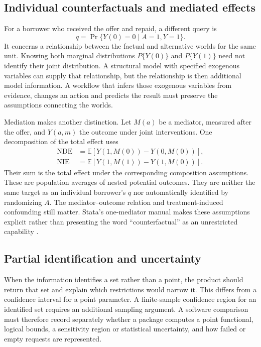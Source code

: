 \subsection{Individual counterfactuals and mediated effects}

For a borrower who received the offer and repaid, a different query is
\[
 q=\Pr\{Y(0)=0\mid A=1,Y=1\}.
\]
It concerns a relationship between the factual and alternative worlds for
the same unit. Knowing both marginal distributions $P\{Y(0)\}$ and
$P\{Y(1)\}$ need not identify their joint distribution. A structural model
with specified exogenous variables can supply that relationship, but the
relationship is then additional model information. A workflow that infers
those exogenous variables from evidence, changes an action and predicts the
result must preserve the assumptions connecting the worlds.

Mediation makes another distinction. Let $M(a)$ be a mediator, measured after
the offer, and $Y(a,m)$ the outcome under joint interventions. One decomposition
of the total effect uses
\begin{align*}
 \mathrm{NDE}&=\mathbb E[Y(1,M(0))-Y(0,M(0))],\\
 \mathrm{NIE}&=\mathbb E[Y(1,M(1))-Y(1,M(0))].
\end{align*}
Their sum is the total effect under the corresponding composition assumptions.
These are population averages of nested potential outcomes. They are neither
the same target as an individual borrower's $q$ nor automatically identified
by randomizing $A$. The mediator--outcome relation and treatment-induced
confounding still matter. Stata's one-mediator manual makes these assumptions
explicit rather than presenting the word ``counterfactual'' as an unrestricted
capability \citep{exec13_ci_stata_mediate}.

\subsection{Partial identification and uncertainty}

When the information identifies a set rather than a point, the product should
return that set and explain which restrictions would narrow it. This differs
from a confidence interval for a point parameter. A finite-sample confidence
region for an identified set requires an additional sampling argument. A
software comparison must therefore record separately whether a package computes
a point functional, logical bounds, a sensitivity region or statistical
uncertainty, and how failed or empty requests are represented.

